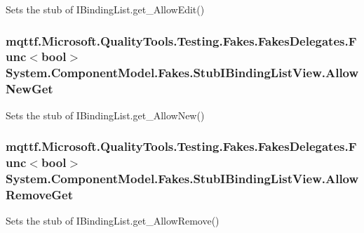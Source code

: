 Sets the stub of I\-Binding\-List.\-get\-\_\-\-Allow\-Edit()

\hypertarget{class_system_1_1_component_model_1_1_fakes_1_1_stub_i_binding_list_view_a12df093a702953ba5b5a44bff553bc69}{
\subsubsection[{Allow\-New\-Get}]{\setlength{\rightskip}{0pt plus 5cm}mqttf.\-Microsoft.\-Quality\-Tools.\-Testing.\-Fakes.\-Fakes\-Delegates.\-Func$<$bool$>$ System.\-Component\-Model.\-Fakes.\-Stub\-I\-Binding\-List\-View.\-Allow\-New\-Get}}\label{class_system_1_1_component_model_1_1_fakes_1_1_stub_i_binding_list_view_a12df093a702953ba5b5a44bff553bc69}


Sets the stub of I\-Binding\-List.\-get\-\_\-\-Allow\-New()

\hypertarget{class_system_1_1_component_model_1_1_fakes_1_1_stub_i_binding_list_view_a13ee963153f73177a19d0f383f988c80}{
\subsubsection[{Allow\-Remove\-Get}]{\setlength{\rightskip}{0pt plus 5cm}mqttf.\-Microsoft.\-Quality\-Tools.\-Testing.\-Fakes.\-Fakes\-Delegates.\-Func$<$bool$>$ System.\-Component\-Model.\-Fakes.\-Stub\-I\-Binding\-List\-View.\-Allow\-Remove\-Get}}\label{class_system_1_1_component_model_1_1_fakes_1_1_stub_i_binding_list_view_a13ee963153f73177a19d0f383f988c80}


Sets the stub of I\-Binding\-List.\-get\-\_\-\-Allow\-Remove()

